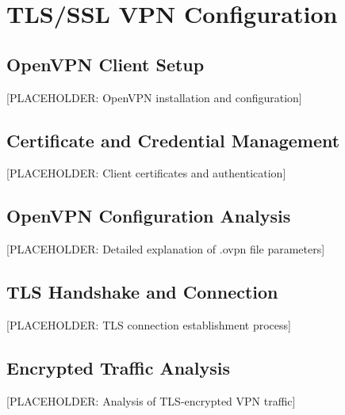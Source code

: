 \newpage

\section{TLS/SSL VPN Configuration}


\subsection{OpenVPN Client Setup}
[PLACEHOLDER: OpenVPN installation and configuration]

\subsection{Certificate and Credential Management}
[PLACEHOLDER: Client certificates and authentication]

\subsection{OpenVPN Configuration Analysis}
[PLACEHOLDER: Detailed explanation of .ovpn file parameters]

\subsection{TLS Handshake and Connection}
[PLACEHOLDER: TLS connection establishment process]

\subsection{Encrypted Traffic Analysis}
[PLACEHOLDER: Analysis of TLS-encrypted VPN traffic]
